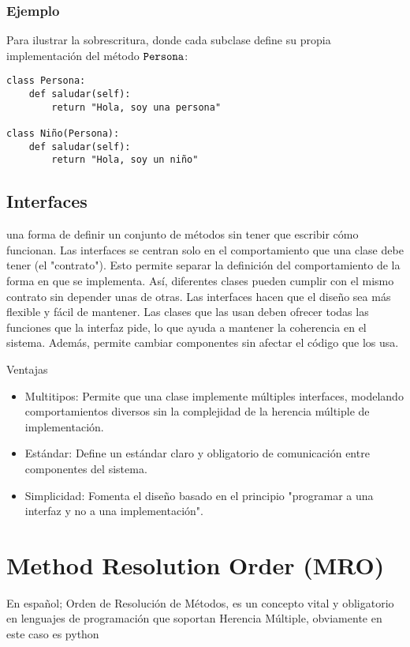 \documentclass{article}
\begin{document}
\subsubsection*{Ejemplo}
Para ilustrar la sobrescritura, donde cada subclase define su propia implementación del método $\verb|Persona|$:
\begin{verbatim}
class Persona:
    def saludar(self):
        return "Hola, soy una persona"

class Niño(Persona):
    def saludar(self):
        return "Hola, soy un niño" 
\end{verbatim}

\subsection{Interfaces}
una forma de definir un conjunto de métodos sin tener que escribir cómo funcionan. Las 
interfaces se centran solo en el comportamiento que una clase debe tener (el "contrato"). 
Esto permite separar la definición del comportamiento de la forma en que se implementa. Así, 
diferentes clases pueden cumplir con el mismo contrato sin depender unas de otras. Las 
interfaces hacen que el diseño sea más flexible y fácil de mantener. Las clases que las usan 
deben ofrecer todas las funciones que la interfaz pide, lo que ayuda a mantener la coherencia 
en el sistema. Además, permite cambiar componentes sin afectar el código que los usa.

\par\vspace{1.2em} 

\large{Ventajas}
\begin{itemize}
    \item {Multitipos:} Permite que una clase implemente múltiples interfaces, modelando 
    comportamientos diversos sin la complejidad de la herencia múltiple de implementación.
    \item {Estándar:} Define un estándar claro y obligatorio de comunicación entre 
    componentes del sistema.
    \item {Simplicidad:} Fomenta el diseño basado en el principio "programar a una interfaz y 
    no a una implementación".
\end{itemize}


\clearpage
\section{Method Resolution Order (MRO)}
En español; Orden de Resolución de Métodos, es un concepto vital y obligatorio en lenguajes de programación que soportan Herencia Múltiple, obviamente en este caso es python
\end{document}
